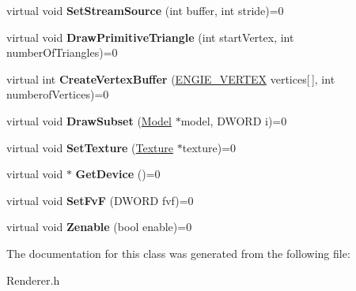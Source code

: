 \begin{DoxyCompactItemize}
\item 
\hypertarget{class_renderer_a9bf165a1520c271b7bbfee6a70766a77}{virtual void {\bfseries Set\-Stream\-Source} (int buffer, int stride)=0}\label{class_renderer_a9bf165a1520c271b7bbfee6a70766a77}

\item 
\hypertarget{class_renderer_a16ae452ed8535d6ebada62910699dc11}{virtual void {\bfseries Draw\-Primitive\-Triangle} (int start\-Vertex, int number\-Of\-Triangles)=0}\label{class_renderer_a16ae452ed8535d6ebada62910699dc11}

\item 
\hypertarget{class_renderer_ae1e5dc6344fe47b849f107b2357267ac}{virtual int {\bfseries Create\-Vertex\-Buffer} (\hyperlink{struct_e_n_g_i_e___v_e_r_t_e_x}{E\-N\-G\-I\-E\-\_\-\-V\-E\-R\-T\-E\-X} vertices\mbox{[}$\,$\mbox{]}, int numberof\-Vertices)=0}\label{class_renderer_ae1e5dc6344fe47b849f107b2357267ac}

\item 
\hypertarget{class_renderer_ab99ef0eafcdc306365871c10af2f0689}{virtual void {\bfseries Draw\-Subset} (\hyperlink{class_model}{Model} $\ast$model, D\-W\-O\-R\-D i)=0}\label{class_renderer_ab99ef0eafcdc306365871c10af2f0689}

\item 
\hypertarget{class_renderer_a98a8e7889a9fcbeafc64bbdf6f2412c9}{virtual void {\bfseries Set\-Texture} (\hyperlink{class_texture}{Texture} $\ast$texture)=0}\label{class_renderer_a98a8e7889a9fcbeafc64bbdf6f2412c9}

\item 
\hypertarget{class_renderer_a52c252a28ba213fa18be4bc25055fc48}{virtual void $\ast$ {\bfseries Get\-Device} ()=0}\label{class_renderer_a52c252a28ba213fa18be4bc25055fc48}

\item 
\hypertarget{class_renderer_a67e9bbda69173ba4328b26882935cc34}{virtual void {\bfseries Set\-Fv\-F} (D\-W\-O\-R\-D fvf)=0}\label{class_renderer_a67e9bbda69173ba4328b26882935cc34}

\item 
\hypertarget{class_renderer_a19ed7be341f5468735f9892a55d405f6}{virtual void {\bfseries Zenable} (bool enable)=0}\label{class_renderer_a19ed7be341f5468735f9892a55d405f6}

\end{DoxyCompactItemize}


The documentation for this class was generated from the following file\-:\begin{DoxyCompactItemize}
\item 
Renderer.\-h\end{DoxyCompactItemize}
